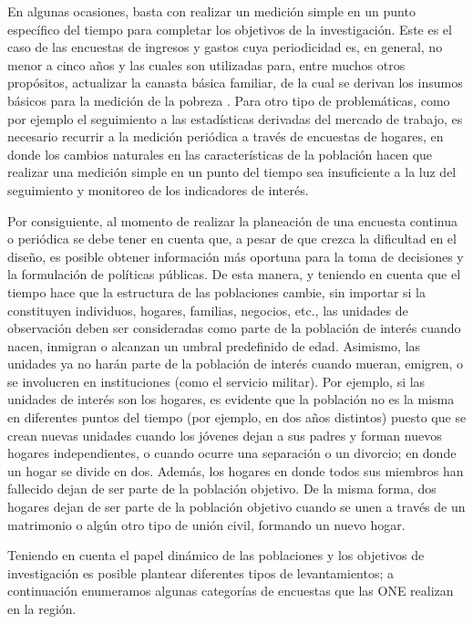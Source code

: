 \documentclass[
  12pt,
]{book}
\begin{document}
En algunas ocasiones, basta con realizar un medición simple en un punto específico del tiempo para completar los objetivos de la investigación. Este es el caso de las encuestas de ingresos y gastos cuya periodicidad es, en general, no menor a cinco años y las cuales son utilizadas para, entre muchos otros propósitos, actualizar la canasta básica familiar, de la cual se derivan los insumos básicos para la medición de la pobreza \citep{CEPAL_2018}. Para otro tipo de problemáticas, como por ejemplo el seguimiento a las estadísticas derivadas del mercado de trabajo, es necesario recurrir a la medición periódica a través de encuestas de hogares, en donde los cambios naturales en las características de la población hacen que realizar una medición simple en un punto del tiempo sea insuficiente a la luz del seguimiento y monitoreo de los indicadores de interés.

Por consiguiente, al momento de realizar la planeación de una encuesta continua o periódica se debe tener en cuenta que, a pesar de que crezca la dificultad en el diseño, es posible obtener información más oportuna para la toma de decisiones y la formulación de políticas públicas. De esta manera, y teniendo en cuenta que el tiempo hace que la estructura de las poblaciones cambie, sin importar si la constituyen individuos, hogares, familias, negocios, etc., las unidades de observación deben ser consideradas como parte de la población de interés cuando nacen, inmigran o alcanzan un umbral predefinido de edad. Asimismo, las unidades ya no harán parte de la población de interés cuando mueran, emigren, o se involucren en instituciones (como el servicio militar). Por ejemplo, si las unidades de interés son los hogares, es evidente que la población no es la misma en diferentes puntos del tiempo (por ejemplo, en dos años distintos) puesto que se crean nuevas unidades cuando los jóvenes dejan a sus padres y forman nuevos hogares independientes, o cuando ocurre una separación o un divorcio; en donde un hogar se divide en dos. Además, los hogares en donde todos sus miembros han fallecido dejan de ser parte de la población objetivo. De la misma forma, dos hogares dejan de ser parte de la población objetivo cuando se unen a través de un matrimonio o algún otro tipo de unión civil, formando un nuevo hogar.

Teniendo en cuenta el papel dinámico de las poblaciones y los objetivos de investigación es posible plantear diferentes tipos de levantamientos; a continuación enumeramos algunas categorías de encuestas que las ONE realizan en la región.
\end{document}
